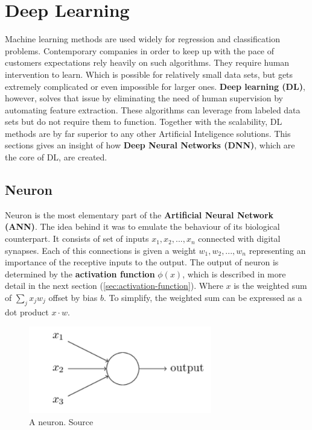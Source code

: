 \chapter{Deep Learning}
\label{cha:dl}

Machine learning methods are used widely for regression and classification problems. Contemporary companies in order to keep up with the pace of customers expectations rely heavily on such algorithms. They require human intervention to learn. Which is possible for relatively small data sets, but gets extremely complicated or even impossible for larger ones. \textbf{Deep learning (DL)}, however, solves that issue by eliminating the need of human supervision by automating feature extraction. These algorithms can leverage from labeled data sets but do not require them to function. Together with the scalability, DL methods are by far superior to any other Artificial Inteligence solutions. This sections gives an insight of how \textbf{Deep Neural Networks (DNN)}, which are the core of DL, are created.


\section{Neuron}
\label{sec:neuron}

Neuron is the most elementary part of the \textbf{Artificial Neural Network (ANN)}. The idea behind it was to emulate the behaviour of its biological counterpart. It consists of set of inputs $x_1, x_2, ..., x_n$ connected with digital synapses. Each of this connections is given a weight $w_1, w_2, ..., w_n$ representing an importance of the receptive inputs to the output. The output of neuron is determined by the \textbf{activation function} $\phi(x)$, which is described in more detail in the next section (\ref{sec:activation-function}). Where $x$ is the weighted sum of $\sum_j {x_j}{w_j}$ offset by bias $b$. To simplify, the weighted sum can be expressed as a dot product $x \cdot w$.

\begin{figure}[h]
    \centering
    \includegraphics[width=8cm]{img/Perceptron.png}
    \caption{A neuron. Source \cite{NNandDL}}
    \label{fig:neuron}
\end{figure}

